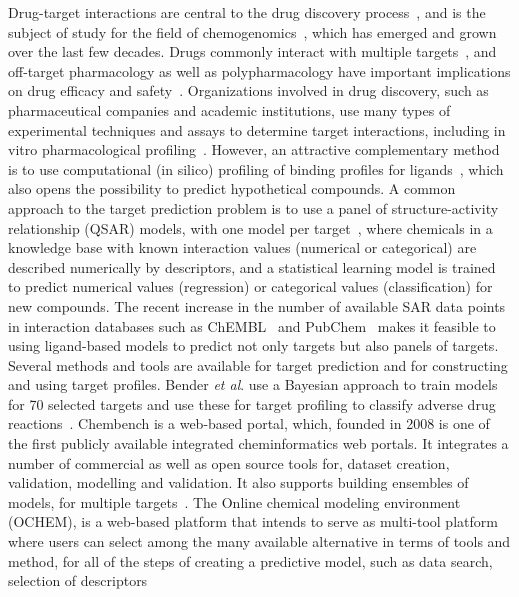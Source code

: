 \documentclass[utf8]{frontiersSCNS} %
\begin{document}
Drug-target interactions are central to the drug discovery
process~\cite{Yildirim:2007vh}, and is the subject of study for the field of
chemogenomics~\cite{Bredel2004}, which has emerged and grown over the last
few decades. Drugs commonly interact with multiple
targets~\cite{hopkins2008network}, and off-target pharmacology as well as
polypharmacology have important implications on drug efficacy and
safety~\cite{Peters:2013yg,Ravikumar:2018qd}. Organizations involved in drug
discovery, such as pharmaceutical companies and academic institutions, use
many types of experimental techniques and assays to determine target
interactions, including in vitro pharmacological profiling~\cite{Bowes2012}.
However, an attractive complementary method is to use computational (in
silico) profiling of binding profiles for
ligands~\cite{Cereto-Massague:2015px}, which also opens the possibility to
predict hypothetical compounds. A common approach to the target prediction
problem is to use a panel of structure-activity relationship (QSAR) models,
with one model per target~\cite{HanschQSAR}, where chemicals in a knowledge
base with known interaction values (numerical or categorical) are described
numerically by descriptors, and a statistical learning model is trained to
predict numerical values (regression) or categorical values (classification)
for new compounds. The recent increase in the number of available SAR data
points in interaction databases such as ChEMBL~\cite{Gaulton:2017tm} and
PubChem~\cite{Wang:2017cy} makes it feasible to using ligand-based models to
predict not only targets but also panels of targets. Several methods and
tools are available for target prediction and for constructing and using
target profiles.
%
Bender \textit{et al}. use a Bayesian approach to train models for 70
selected targets and use these for target profiling to classify adverse drug
reactions~\cite{Bender:2007ib}.
%
Chembench is a web-based portal, which, founded in 2008 is one of the first
publicly available integrated cheminformatics web portals. It integrates a
number of commercial as well as open source tools for, dataset creation,
validation, modelling and validation. It also supports building ensembles of
models, for multiple targets~\cite{Walker2010,Capuzzi2017}.
%
The Online chemical modeling environment (OCHEM), is a web-based platform
that intends to serve as multi-tool platform where users can select among the
many available alternative in terms of tools and method, for all of the steps
of creating a predictive model, such as data search, selection of descriptors
\end{document}
